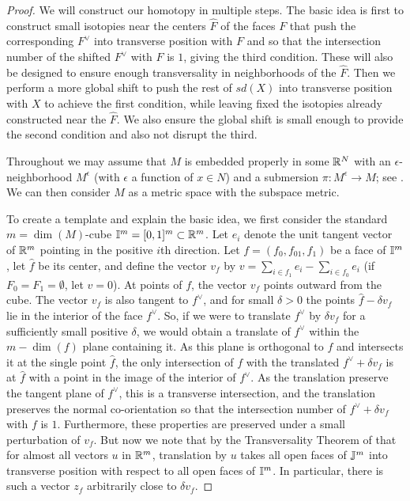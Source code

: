 \begin{proof}
	We will construct our homotopy in multiple steps.
	The basic idea is first to construct small isotopies near the centers $\hat F$ of the faces $F$ that push the corresponding $F^\vee$ into transverse position with $F$ and so that the intersection number of the shifted $F^\vee$ with $F$ is $1$, giving the third condition.
	These will also be designed to ensure enough transversality in neighborhoods of the $\hat F$.
	Then we perform a more global shift to push the rest of $sd(X)$ into transverse position with $X$ to achieve the first condition, while leaving fixed the isotopies already constructed near the $\hat F$.
	We also ensure the global shift is small enough to provide the second condition and also not disrupt the third.

	Throughout we may assume that $M$ is embedded properly in some $\mathbb{R}^N$ with an $\epsilon$-neighborhood $M^\epsilon$ (with $\epsilon$ a function of $x \in N$) and a submersion $\pi \colon M^\epsilon \to M$; see \cite[Section 2.3]{GuPo74}.
	We can then consider $M$ as a metric space with the subspace metric.

	To create a template and explain the basic idea, we first consider the standard $m = \dim(M)$-cube $\mathbb{I}^m = [0,1]^m \subset \mathbb{R}^m$.
	Let $e_i$ denote the unit tangent vector of $\mathbb{R}^m$ pointing in the positive $i$th direction.
	Let $f = (f_0,f_{01},f_1)$ be a face of $\mathbb{I}^m$, let $\hat f$ be its center, and define the vector $v_f$ by $v = \sum_{i \in f_1} e_i-\sum_{i \in f_0} e_i$ (if $F_0 = F_1 = \emptyset$, let $v = 0$).
	At points of $f$, the vector $v_f$ points outward from the cube.
	The vector $v_f$ is also tangent to $f^\vee$, and for small $\delta>0$ the points $\hat f-\delta v_f$ lie in the interior of the face $f^\vee$.
	So, if we were to translate $f^\vee$ by $\delta v_f$ for a sufficiently small positive $\delta$, we would obtain a translate of $f^\vee$ within the $m-\dim(f)$ plane containing it.
	As this plane is orthogonal to $f$ and intersects it at the single point $\hat f$, the only intersection of $f$ with the translated $f^\vee+\delta v_f$ is at $\hat f$ with a point in the image of the interior of $f^\vee$.
	As the translation preserve the tangent plane of $f^\vee$, this is a transverse intersection, and the translation preserves the normal co-orientation so that the intersection number of $f^\vee+\delta v_f$ with $f$ is $1$.
	Furthermore, these properties are preserved under a small perturbation of $v_f$.
	But now we note that by the Transversality Theorem of \cite{GuPo74} that for almost all vectors $u$ in $\mathbb{R}^m$, translation by $u$ takes all open faces of $\mathbb{J}^m$ into transverse position with respect to all open faces of $\mathbb{I}^m$.
	In particular, there is such a vector $z_f$ arbitrarily close to $\delta v_f$.


\end{proof}
